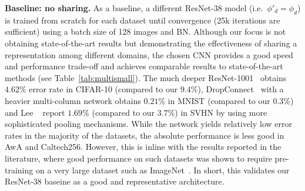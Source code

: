 \documentclass[10pt,twocolumn,letterpaper]{article}
\renewcommand{\paragraph}[1]{\par\medskip\noindent\textbf{#1}}
\begin{document}
\paragraph{Baseline: no sharing.} As a baseline, a different ResNet-38 model (i.e.\ $\phi'_d = \phi_d$) is trained from scratch for each dataset until convergence (25k iterations are sufficient) using a batch size of 128 images and BN. Although our focus is not obtaining state-of-the-art results but demonstrating the effectiveness of sharing a representation among different domains, the chosen CNN provides a good speed and performance trade-off and achieves comparable results to state-of-the-art methods (see Table~\ref{tab:multismall}). The much deeper ResNet-1001~\cite{he2016identity} obtains $4.62\%$ error rate in CIFAR-10 (compared to our $9.4\%$), DropConnect~\cite{wan2013regularization} with a heavier multi-column network obtains $0.21\%$ in MNIST (compared to our $0.3\%$) and Lee \etal~\cite{lee2016generalizing} report $1.69\%$ (compared to our $3.7\%$) in SVHN by using more sophisticated pooling mechanisms. While the network yields relatively low error rates in the majority of the datasets, the absolute performance is less good in AwA and Caltech256. However, this is inline with the results reported in the literature, where good  performance on such datasets was shown to require pre-training on a very large dataset such as ImageNet~\cite{Donahue2013,zeiler14visualizing}. In short, this validates our ResNet-38 baseine as a good and representative architecture.
\end{document}
